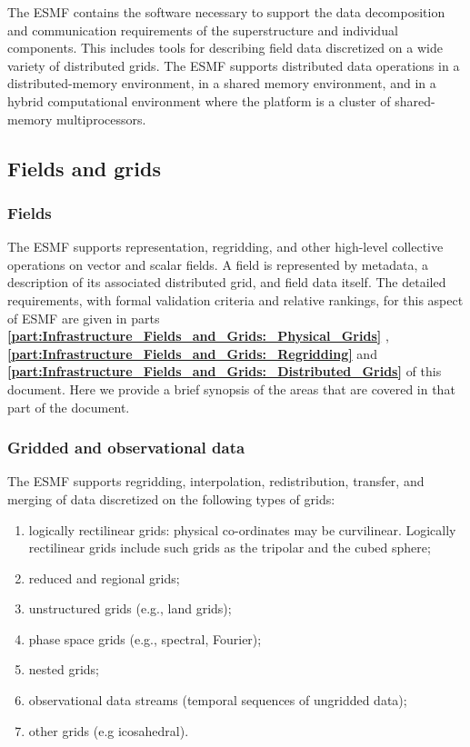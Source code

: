 The ESMF contains the software necessary to support the data
decomposition and communication requirements of the superstructure and
individual components.  This includes tools for describing field
data discretized on a wide variety of distributed grids.  The ESMF
supports distributed data operations in a distributed-memory environment, 
in a shared memory environment, and in a hybrid computational environment 
where the platform is a cluster of shared-memory multiprocessors.

\subsection{Fields and grids}

\subsubsection{Fields}
The ESMF supports representation, regridding, and other high-level
collective operations on vector and scalar fields.  A field is represented 
by metadata, a description of its associated distributed grid, and field 
data itself.
The detailed requirements, with formal validation criteria
and relative rankings, for this aspect of ESMF are given
in parts {\bf \ref{part:Infrastructure_Fields_and_Grids:_Physical_Grids} },
{\bf \ref{part:Infrastructure_Fields_and_Grids:_Regridding} }
and 
{\bf \ref{part:Infrastructure_Fields_and_Grids:_Distributed_Grids} } of this document.
Here we provide a brief synopsis of the areas that are covered
in that part of the document.

\subsubsection{Gridded and observational data}

The ESMF supports regridding, interpolation, redistribution,
transfer, and merging of data discretized on the following types of grids:

\begin{enumerate}
\item logically rectilinear grids: physical co-ordinates may be
  curvilinear. Logically rectilinear grids include such grids as the
  tripolar and the cubed sphere;
\item reduced and regional grids;
\item unstructured grids (e.g., land grids);
\item phase space grids (e.g., spectral, Fourier);
\item nested grids;
\item observational data streams (temporal sequences of ungridded data);
\item other grids (e.g icosahedral).
\end{enumerate}


